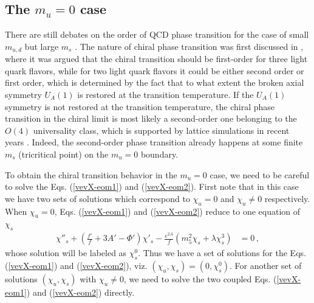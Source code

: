 \documentclass[11pt,a4paper,psfrag]{article}
\begin{document}
\subsection{The $m_u=0$ case}\label{mu-0-case1}

There are still debates on the order of QCD phase transition for the case of small $m_{u,d}$ but large $m_{s}$ \cite{Laermann:2003cv,Petreczky:2012rq}. The nature of chiral phase transition was first discussed in \cite{Pisarski:1983ms}, where it was argued that the chiral transition should be first-order for three light quark flavors, while for two light quark flavors it could be either second order or first order, which is determined by the fact that to what extent the broken axial symmetry $U_{A}(1)$ is restored at the transition temperature. If the $U_{A}(1)$ symmetry is not restored at the transition temperature, the chiral phase transition in the chiral limit is most likely a second-order one belonging to the $O(4)$ universality class, which is supported by lattice simulations in recent years \cite{Bhattacharya:2014ara}. Indeed, the second-order phase transition already happens at some finite $m_{s}$ (tricritical point) on the $m_u=0$ boundary.

To obtain the chiral transition behavior in the $m_u=0$ case, we need to be careful to solve the Eqs. (\ref{vevX-eom1}) and (\ref{vevX-eom2}). First note that in this case we have two sets of solutions which correspond to $\chi_{u}=0$ and $\chi_{u}\neq 0$ respectively. When $\chi_{u}=0$, Eqs. (\ref{vevX-eom1}) and (\ref{vevX-eom2}) reduce to one equation of $\chi_{s}$
\begin{align}\label{Xu0-eomofvevXs1}
\chi''_{s} +\left(\frac{f'}{f}+3A'-\Phi'\right)\chi'_{s} -\frac{e^{2A}}{f}\left(m_5^2\chi_s +\lambda\chi_s^3\right) &=0 \,,
\end{align}
whose solution will be labeled as $\chi^{0}_{s}$. Thus we have a set of solutions for the Eqs. (\ref{vevX-eom1}) and (\ref{vevX-eom2}), viz. $(\chi_{u},\chi_{s})=(0,\chi^{0}_{s})$. For another set of solutions $(\chi_{u},\chi_{s})$ with $\chi_{u}\neq 0$, we need to solve the two coupled Eqs. (\ref{vevX-eom1}) and (\ref{vevX-eom2}) directly.
\end{document}
